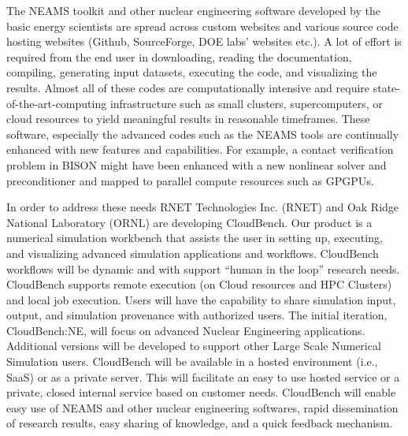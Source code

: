 The NEAMS toolkit and other nuclear engineering software developed by the basic energy scientists are spread across custom 
websites and various source code hosting websites (Github, SourceForge, DOE labs' websites etc.). A lot of effort is 
required from the end user in downloading, reading the documentation, compiling, generating input datasets, executing 
the code, and visualizing the results. Almost all of these codes are computationally intensive and require 
state-of-the-art-computing infrastructure such as small clusters, supercomputers, or cloud resources to yield meaningful 
results in reasonable timeframes. These software, especially the advanced codes such as the NEAMS tools are continually 
enhanced with new features and capabilities. For example, a contact verification problem in BISON might have been 
enhanced with a new nonlinear solver and preconditioner and mapped to parallel compute resources such as GPGPUs. 


In order to address these needs RNET Technologies Inc. (RNET) and Oak
Ridge National Laboratory (ORNL) are developing CloudBench. Our
product is a numerical simulation workbench that assists the user in
setting up, executing, and visualizing advanced simulation
applications and workflows. CloudBench workflows will be dynamic and with support ``human in the loop'' research needs. CloudBench supports remote execution (on Cloud resources
and HPC Clusters) and local job execution. Users will have the
capability to share simulation input, output, and simulation
provenance with authorized users. The initial iteration,
CloudBench:NE, will focus on advanced Nuclear Engineering
applications. Additional versions will be developed to support other
Large Scale Numerical Simulation users. CloudBench will be available
in a hosted environment (i.e., SaaS) or as a private server. This
will facilitate an easy to use hosted service or a private, closed
internal service based on customer needs. CloudBench will enable easy use
of NEAMS and other nuclear engineering softwares, rapid dissemination
of research results, easy sharing of knowledge, and a quick feedback
mechanism.


